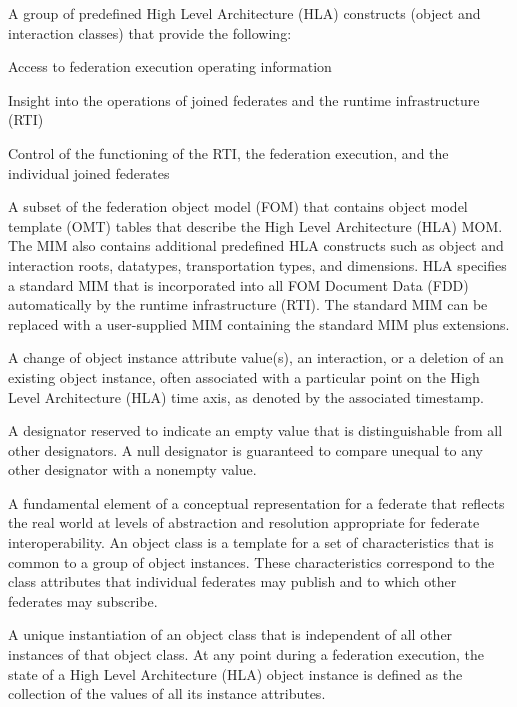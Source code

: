  A group of predefined High Level Architecture (HLA) constructs (object and interaction classes) that provide the following:
\begin{stdalphalist}
    \item Access to federation execution operating information
    \item Insight into the operations of joined federates and the runtime infrastructure (RTI)
    \item Control of the functioning of the RTI, the federation execution, and the individual joined federates
\end{stdalphalist}

 A subset of the federation object model (FOM) that contains object model template (OMT) tables that describe the High Level Architecture (HLA) MOM. The MIM also contains additional predefined HLA constructs such as object and interaction roots, datatypes, transportation types, and dimensions. HLA specifies a standard MIM that is incorporated into all FOM Document Data (FDD) automatically by the runtime infrastructure (RTI). The standard MIM can be replaced with a user-supplied MIM containing the standard MIM plus extensions.

 A change of object instance attribute value(s), an interaction, or a deletion of an existing object instance, often associated with a particular point on the High Level Architecture (HLA) time axis, as denoted by the associated timestamp.

 A designator reserved to indicate an empty value that is distinguishable from all other designators. A null designator is guaranteed to compare unequal to any other designator with a nonempty value.

 A fundamental element of a conceptual representation for a federate that reflects the real world at levels of abstraction and resolution appropriate for federate interoperability. An object class is a template for a set of characteristics that is common to a group of object instances. These characteristics correspond to the class attributes that individual federates may publish and to which other federates may subscribe.

 A unique instantiation of an object class that is independent of all other instances of that object class. At any point during a federation execution, the state of a High Level Architecture (HLA) object instance is defined as the collection of the values of all its instance attributes.

